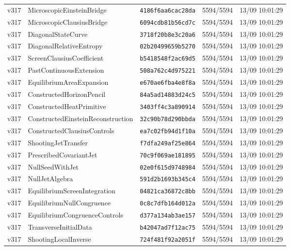 \documentclass[11pt]{article}
\theoremstyle{definition}\newtheorem{deriv}{Derivação}
\begin{document}
{\begin{longtable}{@{}lllll@{}}
v317 & MicroscopicEinsteinBridge & \texttt{4186f6aa6cac28da} & 5594/5594 & 13/09 10:01:29 \\
v317 & MicroscopicClausiusBridge & \texttt{6094cdb81b56cd7c} & 5594/5594 & 13/09 10:01:29 \\
v317 & DiagonalStateCurve & \texttt{3718f20b8e3c20a6} & 5594/5594 & 13/09 10:01:29 \\
v317 & DiagonalRelativeEntropy & \texttt{02b20499659b5270} & 5594/5594 & 13/09 10:01:29 \\
v317 & ScreenClausiusCoefficient & \texttt{b5418548f2ac69d5} & 5594/5594 & 13/09 10:01:29 \\
v317 & PastContinuousExtension & \texttt{508a762c4d975221} & 5594/5594 & 13/09 10:01:29 \\
v317 & EquilibriumAreaExpansion & \texttt{e670ae6fba4e8f8a} & 5594/5594 & 13/09 10:01:29 \\
v317 & ConstructedHorizonPencil & \texttt{84a5ad14883d24c5} & 5594/5594 & 13/09 10:01:29 \\
v317 & ConstructedHeatPrimitive & \texttt{3403ff4c3a890914} & 5594/5594 & 13/09 10:01:29 \\
v317 & ConstructedEinsteinReconstruction & \texttt{32c90b78d290bbda} & 5594/5594 & 13/09 10:01:29 \\
v317 & ConstructedClausiusControls & \texttt{ea7c02fb94d1f10a} & 5594/5594 & 13/09 10:01:29 \\
v317 & ShootingJetTransfer & \texttt{f7dfa249af25e864} & 5594/5594 & 13/09 10:01:29 \\
v317 & PrescribedCovariantJet & \texttt{70c9f069ae181895} & 5594/5594 & 13/09 10:01:29 \\
v317 & NullSeedWithJet & \texttt{02e0f615d9748984} & 5594/5594 & 13/09 10:01:29 \\
v317 & NullJetAlgebra & \texttt{591d2b1693b345c4} & 5594/5594 & 13/09 10:01:29 \\
v317 & EquilibriumScreenIntegration & \texttt{04821ca36872c8bb} & 5594/5594 & 13/09 10:01:29 \\
v317 & EquilibriumNullCongruence & \texttt{0c8c7dfb164d012a} & 5594/5594 & 13/09 10:01:29 \\
v317 & EquilibriumCongruenceControls & \texttt{d377a134ab3ae157} & 5594/5594 & 13/09 10:01:29 \\
v317 & TransverseInitialData & \texttt{b42047ad7f12ac75} & 5594/5594 & 13/09 10:01:29 \\
v317 & ShootingLocalInverse & \texttt{724f481f92a2051f} & 5594/5594 & 13/09 10:01:29 \\

\end{longtable}}
\end{document}
